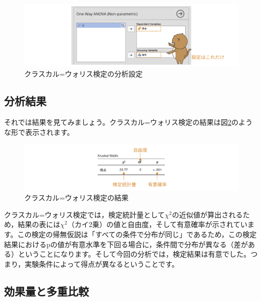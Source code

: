 \documentclass[
  12pt,
  a5jpaper,
  lualatex, ja=standard]{bxjsbook}
\begin{document}
\begin{figure}[!ht]

{\centering \includegraphics[width=1\linewidth]{images/ANOVA/kw-set-var} 

}

\caption{クラスカル=ウォリス検定の分析設定}\label{fig:ANOVA-kw-set-var}
\end{figure}

\hypertarget{sub:ANOVA-kw-results}{%
\subsection{分析結果}\label{sub:ANOVA-kw-results}}

それでは結果を見てみましょう。クラスカル=ウォリス検定の結果は図\ref{fig:ANOVA-kw-results}のような形で表示されます。

\begin{figure}[!ht]

{\centering \includegraphics[width=1\linewidth]{images/ANOVA/kw-results} 

}

\caption{クラスカル=ウォリス検定の結果}\label{fig:ANOVA-kw-results}
\end{figure}

クラスカル=ウォリス検定では，検定統計量として\(\chi^2\)の近似値が算出されるため，結果の表には\(\chi^2\)（カイ2乗）の値と自由度，そして有意確率が示されています。この検定の帰無仮説は「すべての条件で分布が同じ」であるため，この検定結果におけるpの値が有意水準を下回る場合に，条件間で分布が異なる（差がある）ということになります。そして今回の分析では，検定結果は有意でした。つまり，実験条件によって得点が異なるということです。

\hypertarget{sub:ANOVA-kw-others}{%
\subsection{効果量と多重比較}\label{sub:ANOVA-kw-others}}
\end{document}
